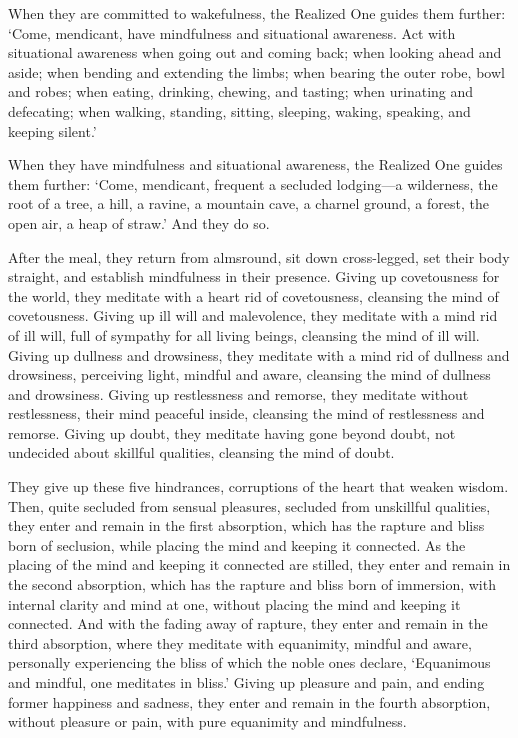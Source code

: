 \documentclass[12pt,openany]{book}%
\begin{document}
When they are committed to wakefulness, the Realized One guides them further: ‘Come, mendicant, have mindfulness and situational awareness. Act with situational awareness when going out and coming back; when looking ahead and aside; when bending and extending the limbs; when bearing the outer robe, bowl and robes; when eating, drinking, chewing, and tasting; when urinating and defecating; when walking, standing, sitting, sleeping, waking, speaking, and keeping silent.’ 

When they have mindfulness and situational awareness, the Realized One guides them further: ‘Come, mendicant, frequent a secluded lodging—a wilderness, the root of a tree, a hill, a ravine, a mountain cave, a charnel ground, a forest, the open air, a heap of straw.’ And they do so. 

After the meal, they return from almsround, sit down cross-legged, set their body straight, and establish mindfulness in their presence. Giving up covetousness for the world, they meditate with a heart rid of covetousness, cleansing the mind of covetousness. Giving up ill will and malevolence, they meditate with a mind rid of ill will, full of sympathy for all living beings, cleansing the mind of ill will. Giving up dullness and drowsiness, they meditate with a mind rid of dullness and drowsiness, perceiving light, mindful and aware, cleansing the mind of dullness and drowsiness. Giving up restlessness and remorse, they meditate without restlessness, their mind peaceful inside, cleansing the mind of restlessness and remorse. Giving up doubt, they meditate having gone beyond doubt, not undecided about skillful qualities, cleansing the mind of doubt. 

They give up these five hindrances, corruptions of the heart that weaken wisdom. Then, quite secluded from sensual pleasures, secluded from unskillful qualities, they enter and remain in the first absorption, which has the rapture and bliss born of seclusion, while placing the mind and keeping it connected. As the placing of the mind and keeping it connected are stilled, they enter and remain in the second absorption, which has the rapture and bliss born of immersion, with internal clarity and mind at one, without placing the mind and keeping it connected. And with the fading away of rapture, they enter and remain in the third absorption, where they meditate with equanimity, mindful and aware, personally experiencing the bliss of which the noble ones declare, ‘Equanimous and mindful, one meditates in bliss.’ Giving up pleasure and pain, and ending former happiness and sadness, they enter and remain in the fourth absorption, without pleasure or pain, with pure equanimity and mindfulness. 
\end{document}
